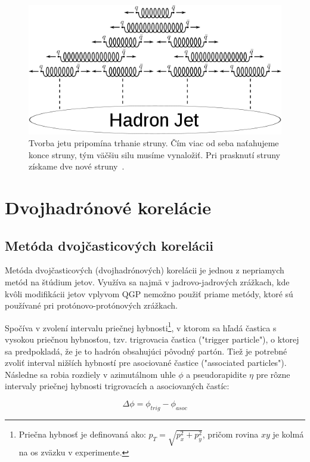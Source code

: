 \documentclass[thesismargins, thesislinespacing]{rnthesis}
\begin{document}
\begin{figure}[hbtp!]
	\begin{center}
	\includegraphics[scale=0.4]{./Obrazky_praca/jet.png}
	\caption{Tvorba jetu pripomína trhanie struny. Čím viac od seba naťahujeme konce struny, tým väčšiu silu musíme vynaložiť. Pri prasknutí struny získame dve nové struny~\cite{8}.}
	\label{jet}
	\end{center}
\end{figure}  


\chapter{Dvojhadrónové korelácie}

\section{Metóda dvojčasticových korelácii}
\label{korel}
Metóda dvojčasticových (dvojhadrónových) korelácii je jednou z nepriamych metód na štúdium jetov. Využíva sa najmä v jadrovo-jadrových zrážkach, kde kvôli \-mo\-di\-fi\-ká\-cii jetov vplyvom QGP nemožno použiť priame metódy, ktoré sú používané pri protónovo-protónových zrážkach.

Spočíva v zvolení intervalu priečnej hybnosti\footnote{Priečna hybnosť je definovaná ako: $p_T=\sqrt{p_x^2+p_y^2}$, pričom rovina $xy$ je kolmá na os zväzku v experimente.}, v ktorom sa hľadá častica s vysokou priečnou hybnosťou, tzv. trigrovacia častica ("trigger particle"), o ktorej sa predpokladá, že je to hadrón obsahujúci pôvodný partón. Tiež je potrebné zvoliť interval nižších hybností pre asociované častice ("\-associated particles"). Následne sa robia rozdiely v \-a\-zi\-mu\-tál\-nom uhle $\phi$ a pseudorapidite $\eta$ pre rôzne intervaly priečnej hybnosti trigrovacích a asociovaných častíc:

\begin{equation}
\Delta \phi = \phi_{trig} - \phi_{asoc}
\end{equation}
\end{document}
